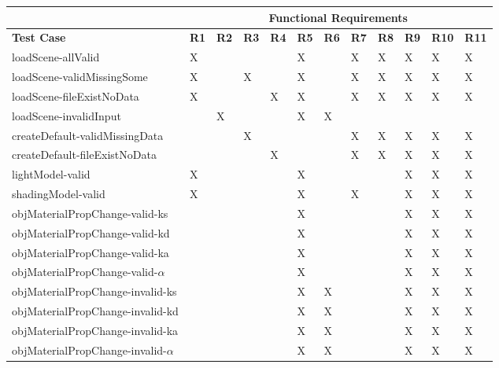 \documentclass[12pt, titlepage]{article}
\begin{document}
	\begin{tabular}{|p{5cm}|l|l|l|l|l|l|l|l|l|l|l|}
		\hline
		& \multicolumn{11}{c}{Functional Requirements}\\
		\hline
		\textbf{Test Case} & \textbf{R1} & \textbf{R2} & \textbf{R3} & 
		\textbf{R4} & \textbf{R5} & \textbf{R6} & \textbf{R7} & \textbf{R8} & 
		\textbf{R9} & \textbf{R10} & \textbf{R11} \\
		\hline
		loadScene-allValid & X & & & & X &  & X & X & X & X & X \\
		loadScene-validMissingSome & X &  & X &  & X & & X & X & X & X & X\\
		loadScene-fileExistNoData & X &  &  & X & X & & X & X & X	& X & X\\
		loadScene-invalidInput &  & X &  & & X & X & & & & & \\
		createDefault-validMissingData & & & X & & & & X &X& X & X & X\\
		createDefault-fileExistNoData & & & & X & & & X & X &X & X & X\\
		lightModel-valid & X & & & & X & & & & X & X & X\\
		shadingModel-valid & X & & & & X & & X & & X & X &X 
		\\				 				
		objMaterialPropChange-valid-ks & & & & & X & & & & X & X & X\\
		objMaterialPropChange-valid-kd & & & & & X & & & & X & X & X\\
		objMaterialPropChange-valid-ka & & & & & X & & & & X & X & X\\
		objMaterialPropChange-valid-$\alpha$ & & & & & X & & & & X & X & X\\
		objMaterialPropChange-invalid-ks & & & & & X &X & & & X & X & X\\
		objMaterialPropChange-invalid-kd & & & & & X &X & & & X & X & X\\
		objMaterialPropChange-invalid-ka & & & & & X &X & & & X & X & X\\
		objMaterialPropChange-invalid-$\alpha$ & & & & & X &X & & & X & X & X\\
		\hline
	\end{tabular}
~\newline
\end{document}
